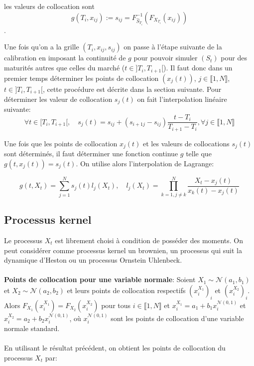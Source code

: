 \documentclass[a4paper,12pt]{report}
\numberwithin{equation}{section}
\theoremstyle{definition}
\numberwithin{equation}{section}
\begin{document}
les valeurs de collocation sont $$g(T_{i},x_{ij}):=s_{ij}=F_{\hat{S}_{T_{i}}}^{-1}(F_{X_{T_{i}}}(x_{ij}))$$. 

Une fois qu'on a la grille $(T_{i},x_{ij},s_{ij})$ on passe à l'étape suivante de la calibration en imposant la continuité de $g$ pour pouvoir simuler $(S_t)$ pour des maturités autres que celles du marché ($t\in]T_{i},T_{i+1}[$). Il faut donc dans un premier temps déterminer les points de collocation $(x_{j}(t))$, $j\in\llbracket1,N\rrbracket$, $t\in]T_{i},T_{i+1}[$, cette procédure est décrite dans la section suivante. Pour déterminer les valeur de collocation $s_{j}(t)$ on fait l'interpolation linéaire suivante:
\begin{equation}
\label{eqInterp}
\forall t\in[T_{i},T_{i+1}[,\quad s_{j}(t)=s_{ij}+(s_{i+1j}-s_{ij})\frac{t-T_{i}}{T_{i+1}-T_{i}},\forall j\in\llbracket1,N\rrbracket
\end{equation}

Une fois que les points de collocation $x_{j}(t)$ et les valeurs de collocations $s_{j}(t)$ sont déterminés, il faut déterminer une fonction continue $g$ telle que $g(t,x_{j}(t))=s_{j}(t)$. On utilise alors l'interpolation de Lagrange:

\begin{equation}
\label{inter}
g(t,X_t)=\sum_{j=1}^{N}s_{j}(t)l_{j}(X_t),\quad l_{j}(X_t)=\prod_{k=1,j\neq k}^{N}\frac{X_t-x_{j}(t)}{x_{k}(t)-x_{j}(t)}
\end{equation}

\subsection{Processus kernel}
\label{seckernel}
Le processus $X_t$ est librement choisi à condition de posséder des moments. On peut considérer comme processus kernel un brownien, un processus qui suit la dynamique d'Heston ou un processus Ornstein Uhlenbeck.
\\\\
\textbf{Points de collocation pour une variable normale}: Soient $X_{1}\sim\mathcal{N}(a_{1},b_{1})$ et $X_{2}\sim\mathcal{N}(a_{2},b_{2})$ et leurs points de collocation respectifs $\left(x_{i}^{X_{1}} \right)_i$ et $\left( x_{i}^{X_{2}} \right)_i$. Alors $F_{X_{1}}(x_{i}^{X_{1}})=F_{X_{2}}(x_{i}^{X_{2}})$ pour tous $i\in\llbracket1,N\rrbracket$ et $x_{i}^{X_{1}}=a_{1}+b_{1}x_{i}^{\mathcal{N}(0,1)}$ et $x_{i}^{X_{2}}=a_{2}+b_{2}x_{i}^{\mathcal{N}(0,1)}$, où $x_{i}^{\mathcal{N}(0,1)}$ sont les points de collocation d'une variable normale standard.
\\\\
En utilisant le résultat précédent, on obtient les points de collocation du processus $X_t$ par:
\end{document}
